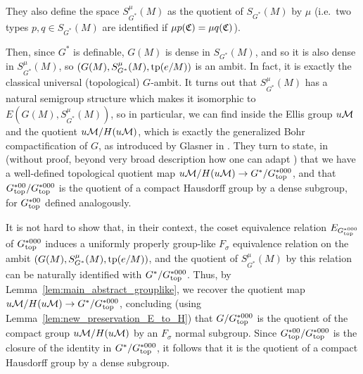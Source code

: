 	They also define the space $S_{G^*}^\mu(M)$ as the quotient of $S_{G^*}(M)$ by $\mu$ (i.e.\ two types $p,q\in S_{G^*}(M)$ are identified if $\mu p({\mathfrak C})=\mu q({\mathfrak C})$).
	
	Then, since $G^*$ is definable, $G(M)$ is dense in $S_{G^*}(M)$, and so it is also dense in $S_{G^*}^\mu(M)$, so $(G(M),S_{G^*}^\mu(M),\operatorname{{tp}}(e/M))$ is an ambit. In fact, it is exactly the classical universal (topological) $G$-ambit.  It turns out that $S_{G^*}^\mu(M)$ has a natural semigroup structure which makes it isomorphic to $E(G(M),S_{G^*}^\mu(M))$, so in particular, we can find inside the Ellis group $u{\mathcal M}$ and the quotient $u{\mathcal M}/H(u{\mathcal M})$, which is exactly the generalized Bohr compactification of $G$, as introduced by Glasner in \cite[Chapter VIII]{Gl76}. They turn to state, in \cite[Theorem 2.24, Theorem 2.25]{KP16} (without proof, beyond very broad description how one can adapt \cite{KP17}) that we have a well-defined topological quotient map $u{\mathcal M}/H(u{\mathcal M})\to G^*/G^{*000}_{\mathrm{top}}$, and that $G^{*00}_{\mathrm{top}}/G^{*000}_{\mathrm{top}}$ is the quotient of a compact Hausdorff group by a dense subgroup, for $G^{*00}_{\mathrm{top}}$ defined analogously.
	
	It is not hard to show that, in their context, the coset equivalence relation $E_{G^{*000}_{\mathrm{top}}}$ of $G^{*000}_{\mathrm{top}}$ induces a uniformly properly group-like $F_\sigma$ equivalence relation on the ambit $(G(M),S_{G^*}^\mu(M),\operatorname{{tp}}(e/M))$, and the quotient of $S_{G^*}^\mu(M)$ by this relation can be naturally identified with $G^*/G^{*000}_{\mathrm{top}}$. Thus, by Lemma~\ref{lem:main_abstract_grouplike}, we recover the quotient map $u{\mathcal M}/H(u{\mathcal M})\to G^*/G^{*000}_{\mathrm{top}}$, concluding (using Lemma~\ref{lem:new_preservation_E_to_H}) that $G/G^{*000}_{\mathrm{top}}$ is the quotient of the compact group $u{\mathcal M}/H(u{\mathcal M})$ by an $F_\sigma$ normal subgroup. Since $G^{*00}_{\mathrm{top}}/G^{*000}_{\mathrm{top}}$ is the closure of the identity in $G^*/G^{*000}_{\mathrm{top}}$, it follows that it is the quotient of a compact Hausdorff group by a dense subgroup.
